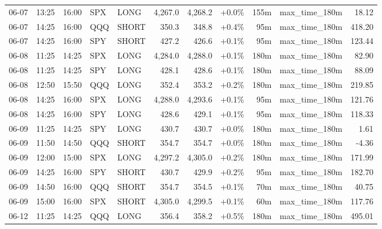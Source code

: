 \documentclass[11pt,a4paper,twoside]{article}
\begin{document}
\begin{center}
\begin{longtable}{>{\color{txtmain}}l l l l l r r r r >{\color{txtmain}}l r}
06-07 & 13:25 & 16:00 & SPX & LONG & 4,267.0 & 4,268.2 & \textcolor{wingreen}{+0.0\%} & 155m & max\_time\_180m & \textcolor{wingreen}{18.12} \\
06-07 & 14:25 & 16:00 & QQQ & SHORT & 350.3 & 348.8 & \textcolor{wingreen}{+0.4\%} & 95m & max\_time\_180m & \textcolor{wingreen}{418.20} \\
06-07 & 14:25 & 16:00 & SPY & SHORT & 427.2 & 426.6 & \textcolor{wingreen}{+0.1\%} & 95m & max\_time\_180m & \textcolor{wingreen}{123.44} \\
06-08 & 11:25 & 14:25 & SPX & LONG & 4,284.0 & 4,288.0 & \textcolor{wingreen}{+0.1\%} & 180m & max\_time\_180m & \textcolor{wingreen}{82.90} \\
06-08 & 11:25 & 14:25 & SPY & LONG & 428.1 & 428.6 & \textcolor{wingreen}{+0.1\%} & 180m & max\_time\_180m & \textcolor{wingreen}{88.09} \\
06-08 & 12:50 & 15:50 & QQQ & LONG & 352.4 & 353.2 & \textcolor{wingreen}{+0.2\%} & 180m & max\_time\_180m & \textcolor{wingreen}{219.85} \\
06-08 & 14:25 & 16:00 & SPX & LONG & 4,288.0 & 4,293.6 & \textcolor{wingreen}{+0.1\%} & 95m & max\_time\_180m & \textcolor{wingreen}{121.76} \\
06-08 & 14:25 & 16:00 & SPY & LONG & 428.6 & 429.1 & \textcolor{wingreen}{+0.1\%} & 95m & max\_time\_180m & \textcolor{wingreen}{118.33} \\
06-09 & 11:25 & 14:25 & SPY & LONG & 430.7 & 430.7 & \textcolor{wingreen}{+0.0\%} & 180m & max\_time\_180m & \textcolor{wingreen}{1.61} \\
06-09 & 11:50 & 14:50 & QQQ & SHORT & 354.7 & 354.7 & \textcolor{wingreen}{+0.0\%} & 180m & max\_time\_180m & \textcolor{lossred}{-4.36} \\
06-09 & 12:00 & 15:00 & SPX & LONG & 4,297.2 & 4,305.0 & \textcolor{wingreen}{+0.2\%} & 180m & max\_time\_180m & \textcolor{wingreen}{171.99} \\
06-09 & 14:25 & 16:00 & SPY & SHORT & 430.7 & 429.9 & \textcolor{wingreen}{+0.2\%} & 95m & max\_time\_180m & \textcolor{wingreen}{182.70} \\
06-09 & 14:50 & 16:00 & QQQ & SHORT & 354.7 & 354.5 & \textcolor{wingreen}{+0.1\%} & 70m & max\_time\_180m & \textcolor{wingreen}{40.75} \\
06-09 & 15:00 & 16:00 & SPX & SHORT & 4,305.0 & 4,299.5 & \textcolor{wingreen}{+0.1\%} & 60m & max\_time\_180m & \textcolor{wingreen}{117.76} \\
06-12 & 11:25 & 14:25 & QQQ & LONG & 356.4 & 358.2 & \textcolor{wingreen}{+0.5\%} & 180m & max\_time\_180m & \textcolor{wingreen}{495.01} \\

\end{longtable}
\end{center}
\end{document}
